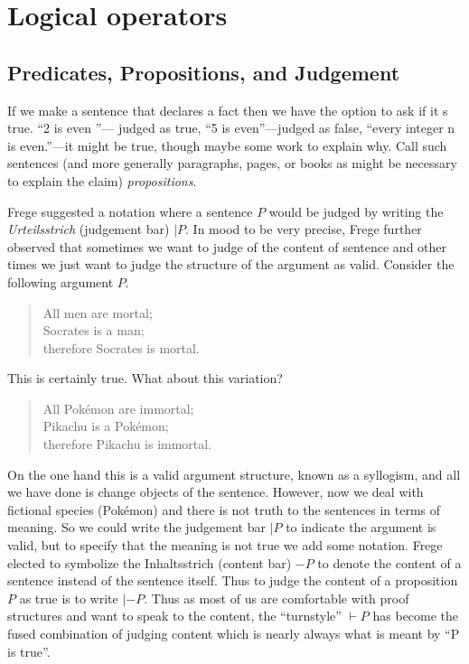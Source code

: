 
\section{Logical operators}


\subsection{Predicates, Propositions, and Judgement}
If we make a sentence that declares a fact then we have the option 
to ask if it s true.  ``2 is even ''--- judged as true, ``5 is even''---judged as false,
``every integer n is even.''---it might be true, though maybe some work to 
explain why.  Call such sentences (and more generally paragraphs, pages, or books 
as might be necessary to explain the claim) \emph{propositions}.

Frege suggested a notation where a sentence $P$ would be judged by writing the
\emph{Urteilsstrich} (judgement bar) $|P$.  In mood to be very precise,
Frege further observed that sometimes we want to judge of the content of sentence 
and other times we just want to judge the structure of the argument as valid.
Consider the following argument $P$.
\begin{quote}
    All men are mortal; \\
    Socrates is a man;\\
    therefore Socrates is mortal.
\end{quote}
This is certainly true.  What about this variation?
\begin{quote}
    All Pok\'emon are immortal; \\
    Pikachu is a Pok\'emon;\\
    therefore Pikachu is immortal.
\end{quote}
On the one hand 
this is a valid argument structure, known as a syllogism,
and all we have done is change objects of the sentence.  
However, now we deal with fictional species (Pok\'emon) and 
there is not truth to the sentences in terms of meaning.
So we could write the judgement bar $|P$ to indicate the argument is valid,
but to specify that the meaning is not true we add some notation.
Frege elected to symbolize the Inhaltsstrich (content bar)
$-P$ to denote the content of a sentence instead of the sentence itself.  
Thus to judge the content of a proposition $P$ as true is to write $|-P$.
Thus as most of us are comfortable with proof structures and want to speak 
to the content, the ``turnstyle'' $\vdash P$ has become the fused combination 
of judging content which is nearly always what is meant by ``P is true''.





